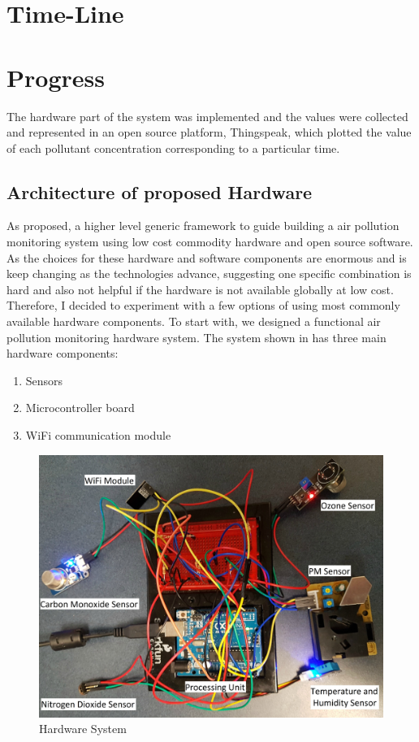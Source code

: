 \documentclass[10pt,a4paper]{report}
\begin{document}
\chapter{Time-Line}

\chapter{Progress}

The hardware part of the system was implemented and the values were collected and represented in an open source platform, Thingspeak, which plotted the value of each pollutant concentration corresponding to a particular time.
\section{Architecture of proposed Hardware}
As proposed, a higher level generic framework to guide building a air pollution monitoring system using low cost commodity hardware and open source software. As the choices for these hardware and software components are enormous and is keep changing as the technologies advance, suggesting one specific combination is hard and also not helpful if the hardware is not available globally at low cost. Therefore, I decided to experiment with a few options of using most commonly available hardware components. To start with, we designed a functional air pollution monitoring hardware system.
The system shown in has three main hardware components:
\begin{enumerate}
\item  Sensors
\item  Microcontroller board
\item  WiFi communication module
\end{enumerate}

\begin{figure}[h!]
  \centering
  \hspace*{-1.25cm}   
\includegraphics[scale=0.094]{images/fig4.jpg}
  \hspace*{-1.25cm}
  \caption{Hardware System}
  \label{arch}
\end{figure}
\end{document}

